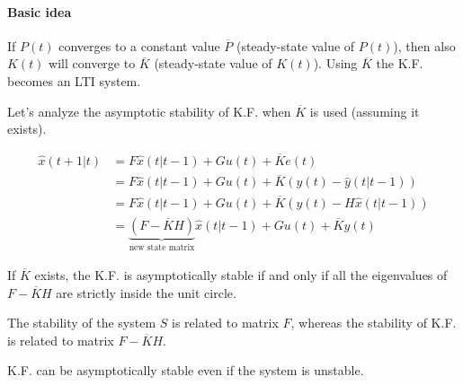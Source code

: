 \paragraph{Basic idea}
If $P(t)$ converges to a constant value $\overline{P}$ (steady-state value of $P(t)$), then also $K(t)$ will converge to $\overline{K}$ (steady-state value of $K(t)$).
Using $\overline{K}$ the K.F. becomes an LTI system.

Let's analyze the asymptotic stability of K.F. when $\overline{K}$ is used (assuming it exists).

\begin{align*}
    \hat{x}(t+1|t) &= F\hat{x}(t|t-1) + Gu(t) + \overline{K}e(t) \\
    &= F\hat{x}(t|t-1) + Gu(t) + \overline{K}(y(t) - \hat{y}(t|t-1)) \\
    &= F\hat{x}(t|t-1) + Gu(t) + \overline{K}(y(t) - H\hat{x}(t|t-1)) \\
    &= \underbrace{(F - \overline{K}H)}_{\text{new state matrix}} \hat{x}(t|t-1) + Gu(t) + \overline{K}y(t)
\end{align*}

\begin{figure}[H]
    \centering
\end{figure}

If $\overline{K}$ exists, the K.F. is asymptotically stable if and only if all the eigenvalues of $F-\overline{K}H$ are strictly inside the unit circle.

\begin{remark}
    The stability of the system $S$ is related to matrix $F$, whereas the stability of K.F. is related to matrix $F-\overline{K}H$.

    K.F. can be asymptotically stable even if the system is unstable.
\end{remark}

